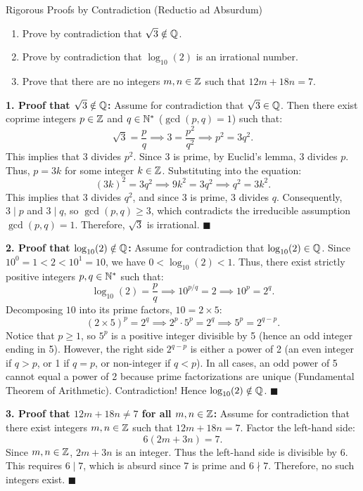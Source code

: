 \begin{exercise}{Rigorous Proofs by Contradiction (Reductio ad Absurdum)}
\begin{enumerate}[leftmargin=1.5em,itemsep=2pt]
  \item Prove by contradiction that $\sqrt{3} \notin \mathbb{Q}$.
  \item Prove by contradiction that $\log_{10}(2)$ is an irrational number.
  \item Prove that there are no integers $m, n \in \mathbb{Z}$ such that $12m + 18n = 7$.
\end{enumerate}
\end{exercise}

\begin{tabletworkspace}[5.0cm]
\end{tabletworkspace}

\begin{solution}
\textbf{1. Proof that $\sqrt{3} \notin \mathbb{Q}$:}
Assume for contradiction that $\sqrt{3} \in \mathbb{Q}$. Then there exist coprime integers $p \in \mathbb{Z}$ and $q \in \mathbb{N}^*$ ($\gcd(p, q) = 1$) such that:
\[
\sqrt{3} = \frac{p}{q} \implies 3 = \frac{p^2}{q^2} \implies p^2 = 3q^2.
\]
This implies that $3$ divides $p^2$. Since 3 is prime, by Euclid's lemma, $3$ divides $p$.
Thus, $p = 3k$ for some integer $k \in \mathbb{Z}$.
Substituting into the equation:
\[
(3k)^2 = 3q^2 \implies 9k^2 = 3q^2 \implies q^2 = 3k^2.
\]
This implies that $3$ divides $q^2$, and since 3 is prime, $3$ divides $q$.
Consequently, $3 \mid p$ and $3 \mid q$, so $\gcd(p, q) \ge 3$, which contradicts the irreducible assumption $\gcd(p, q) = 1$.
Therefore, $\sqrt{3}$ is irrational. \hfill $\blacksquare$

\textbf{2. Proof that $\log_{10}(2) \notin \mathbb{Q}$:}
Assume for contradiction that $\log_{10}(2) \in \mathbb{Q}$.
Since $10^0 = 1 < 2 < 10^1 = 10$, we have $0 < \log_{10}(2) < 1$.
Thus, there exist strictly positive integers $p, q \in \mathbb{N}^*$ such that:
\[
\log_{10}(2) = \frac{p}{q} \implies 10^{p/q} = 2 \implies 10^p = 2^q.
\]
Decomposing $10$ into its prime factors, $10 = 2 \times 5$:
\[
(2 \times 5)^p = 2^q \implies 2^p \cdot 5^p = 2^q \implies 5^p = 2^{q-p}.
\]
Notice that $p \ge 1$, so $5^p$ is a positive integer divisible by 5 (hence an odd integer ending in 5).
However, the right side $2^{q-p}$ is either a power of 2 (an even integer if $q > p$, or 1 if $q = p$, or non-integer if $q < p$).
In all cases, an odd power of 5 cannot equal a power of 2 because prime factorizations are unique (Fundamental Theorem of Arithmetic).
Contradiction! Hence $\log_{10}(2) \notin \mathbb{Q}$. \hfill $\blacksquare$

\textbf{3. Proof that $12m + 18n \ne 7$ for all $m, n \in \mathbb{Z}$:}
Assume for contradiction that there exist integers $m, n \in \mathbb{Z}$ such that $12m + 18n = 7$.
Factor the left-hand side:
\[
6(2m + 3n) = 7.
\]
Since $m, n \in \mathbb{Z}$, $2m + 3n$ is an integer. Thus the left-hand side is divisible by 6.
This requires $6 \mid 7$, which is absurd since $7$ is prime and $6 \nmid 7$.
Therefore, no such integers exist. \hfill $\blacksquare$
\end{solution}

